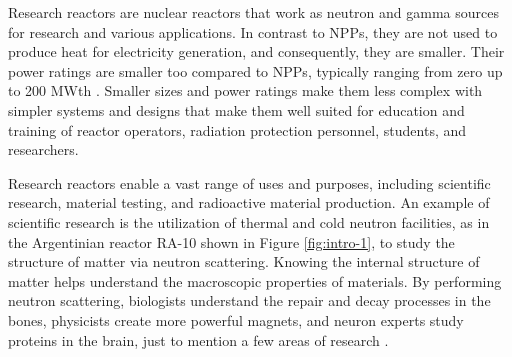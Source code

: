 \label{ch:intro}


Research reactors are nuclear reactors that work as neutron and gamma sources for research and various applications.
In contrast to \glspl*{NPP}, they are not used to produce heat for electricity generation, and consequently, they are smaller.
Their power ratings are smaller too compared to \glspl*{NPP}, typically ranging from zero up to 200 MWth \cite{iaea-research}.
Smaller sizes and power ratings make them less complex with simpler systems and designs that make them well suited for education and training of reactor operators, radiation protection personnel, students, and researchers.

Research reactors enable a vast range of uses and purposes, including scientific research, material testing, and radioactive material production.
An example of scientific research is the utilization of thermal and cold neutron facilities, as in the Argentinian reactor RA-10 shown in Figure \ref{fig:intro-1}, to study the structure of matter via neutron scattering.
Knowing the internal structure of matter helps understand the macroscopic properties of materials.
By performing neutron scattering, biologists understand the repair and decay processes in the bones, physicists create more powerful magnets, and neuron experts study proteins in the brain, just to mention a few areas of research \cite{iaea-research}.

